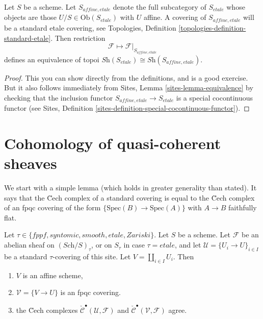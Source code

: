 \begin{lemma}
\label{lemma-alternative}
Let $S$ be a scheme.
Let $S_{affine, etale}$ denote the full subcategory of $S_{etale}$
whose objects are those $U/S \in \text{Ob}(S_{etale})$ with
$U$ affine. A covering of $S_{affine, etale}$ will be a standard
etale covering, see
Topologies, Definition \ref{topologies-definition-standard-etale}.
Then restriction
$$
\mathcal{F} \longmapsto \mathcal{F}|_{S_{affine, etale}}
$$
defines an equivalence of topoi
$\textit{Sh}(S_{etale}) \cong \textit{Sh}(S_{affine, etale})$.
\end{lemma}

\begin{proof}
This you can show directly from the definitions, and is a good exercise.
But it also follows immediately from
Sites, Lemma \ref{sites-lemma-equivalence}
by checking that the inclusion functor
$S_{affine, etale} \to S_{etale}$
is a special cocontinuous functor (see
Sites, Definition \ref{sites-definition-special-cocontinuous-functor}).
\end{proof}







\section{Cohomology of quasi-coherent sheaves}
\label{section-cohomology-quasi-coherent}

\noindent
We start with a simple lemma (which holds in greater generality than
stated). It says that the \u Cech complex of a standard covering is
equal to the \u Cech complex of an fpqc covering of the form
$\{\text{Spec}(B) \to \text{Spec}(A)\}$ with $A \to B$ faithfully flat.

\begin{lemma}
\label{lemma-cech-complex}
Let $\tau \in \{fppf, syntomic, smooth, etale, Zariski\}$.
Let $S$ be a scheme.
Let $\mathcal{F}$ be an abelian sheaf on $(\textit{Sch}/S)_\tau$, or on
$S_\tau$ in case $\tau = etale$, and let
$\mathcal{U} = \{U_i \to U\}_{i \in I}$
be a standard $\tau$-covering of this site.
Let $V = \coprod_{i \in I} U_i$. Then
\begin{enumerate}
\item $V$ is an affine scheme,
\item $\mathcal{V} = \{V \to U\}$ is an fpqc covering.
\item the \u Cech complexes
$\check{\mathcal{C}}^\bullet (\mathcal{U}, \mathcal{F})$ and
$\check{\mathcal{C}}^\bullet (\mathcal{V}, \mathcal{F})$ agree.
\end{enumerate}
\end{lemma}

